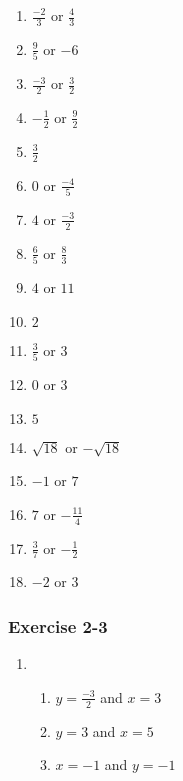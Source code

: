 {\begin{multicols}{3}
\begin{enumerate}[itemsep=1pt,  label=\textbf{\arabic*}. ] 
\item $\frac{-2}{3}$ or $\frac{4}{3}$%
\item $\frac{9}{5}$ or $-6$%
\item $\frac{-3}{2}$ or $\frac{3}{2}$%
\item $-\frac{1}{2}$ or $\frac{9}{2}$%
\item $\frac{3}{2}$%
\item $0$ or $\frac{-4}{5}$%
\item$4$ or $\frac{-3}{2}$ %
\item $\frac{6}{5}$ or $\frac{8}{3}$%
\item $4$ or $11$%
\item $2$%
\item $ \frac{3}{5}$ or $3$%
\item $0$ or $3$%
\item $5$%
\item $\sqrt{18}$ or $-\sqrt{18}$%
\item $-1$ or $7$%
\item $7$ or $-\frac{11}{4}$%
\item $\frac{3}{7}$ or $-\frac{1}{2}$%
\item $-2$ or $3$%
\end{enumerate}




\subsubsection*{Exercise 2-3} %

\begin{enumerate}[noitemsep, label=\textbf{\arabic*}. ] 

\item %
\begin{enumerate}[noitemsep, label=\textbf{(\alph*)} ] 
\item $y = \frac{-3}{2}$ and $x=3$%
\item $y = 3$ and $x = 5$%
\item $x = -1$ and $y = -1$%
\end{enumerate}


\end{enumerate}
\end{multicols}}

